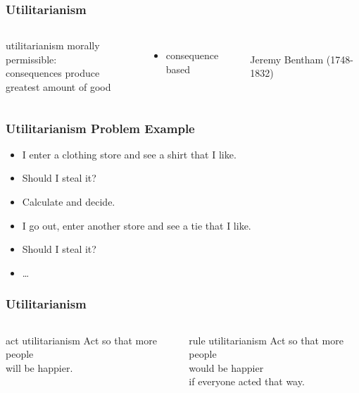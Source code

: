 \documentclass[dvipsnames]{beamer}
\theoremstyle{plain}
\begin{document}
\begin{frame}
  \frametitle{Utilitarianism}

  \begin{columns}
    \begin{block}{utilitarianism}
      morally permissible:\\
      consequences produce\\
      greatest amount of good
    \end{block}

    \begin{itemize}
      \item consequence based
    \end{itemize}

    \begin{center}
      \\
      Jeremy Bentham (1748-1832)
    \end{center}
  \end{columns}
\end{frame}

\begin{frame}
  \frametitle{Utilitarianism Problem Example}

  \begin{itemize}
    \item I enter a clothing store and see a shirt that I like.
    \item Should I steal it?
    \item Calculate and decide.

    \pause
    \bigskip
    \item I go out, enter another store and see a tie that I like.
    \item Should I steal it?
    \item \ldots
  \end{itemize}
\end{frame}

\begin{frame}
  \frametitle{Utilitarianism}

  \begin{columns}[t]
    \begin{block}{act utilitarianism}
      Act so that more people\\
      will be happier.
    \end{block}

    \pause
    \begin{block}{rule utilitarianism}
      Act so that more people\\
      would be happier\\
      if everyone acted that way.
    \end{block}
  \end{columns}
\end{frame}
\end{document}
